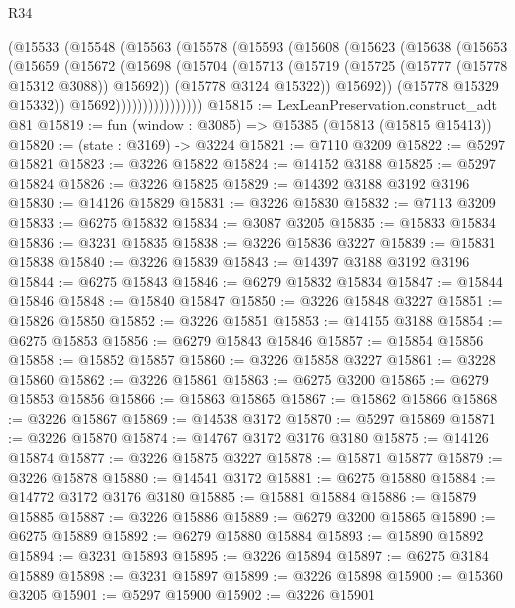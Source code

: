 \begin{lexlean}{R34}
\begin{coremodule}
                (@15533
                  (@15548
                    (@15563
                      (@15578
                        (@15593
                          (@15608
                            (@15623
                              (@15638
                                (@15653
                                  (@15659
                                    (@15672
                                      (@15698
                                        (@15704
                                          (@15713
                                            (@15719 (@15725 (@15777 (@15778 @15312 @3088)) @15692))
                                            (@15778 @3124 @15322))
                                          @15692))
                                      (@15778 @15329 @15332))
                                    @15692))))))))))))))))
@15815 := LexLeanPreservation.construct_adt @81
@15819 := fun (window : @3085) => @15385 (@15813 (@15815 @15413))
@15820 := (state : @3169) -> @3224
@15821 := @7110 @3209
@15822 := @5297 @15821
@15823 := @3226 @15822
@15824 := @14152 @3188
@15825 := @5297 @15824
@15826 := @3226 @15825
@15829 := @14392 @3188 @3192 @3196
@15830 := @14126 @15829
@15831 := @3226 @15830
@15832 := @7113 @3209
@15833 := @6275 @15832
@15834 := @3087 @3205
@15835 := @15833 @15834
@15836 := @3231 @15835
@15838 := @3226 @15836 @3227
@15839 := @15831 @15838
@15840 := @3226 @15839
@15843 := @14397 @3188 @3192 @3196
@15844 := @6275 @15843
@15846 := @6279 @15832 @15834
@15847 := @15844 @15846
@15848 := @15840 @15847
@15850 := @3226 @15848 @3227
@15851 := @15826 @15850
@15852 := @3226 @15851
@15853 := @14155 @3188
@15854 := @6275 @15853
@15856 := @6279 @15843 @15846
@15857 := @15854 @15856
@15858 := @15852 @15857
@15860 := @3226 @15858 @3227
@15861 := @3228 @15860
@15862 := @3226 @15861
@15863 := @6275 @3200
@15865 := @6279 @15853 @15856
@15866 := @15863 @15865
@15867 := @15862 @15866
@15868 := @3226 @15867
@15869 := @14538 @3172
@15870 := @5297 @15869
@15871 := @3226 @15870
@15874 := @14767 @3172 @3176 @3180
@15875 := @14126 @15874
@15877 := @3226 @15875 @3227
@15878 := @15871 @15877
@15879 := @3226 @15878
@15880 := @14541 @3172
@15881 := @6275 @15880
@15884 := @14772 @3172 @3176 @3180
@15885 := @15881 @15884
@15886 := @15879 @15885
@15887 := @3226 @15886
@15889 := @6279 @3200 @15865
@15890 := @6275 @15889
@15892 := @6279 @15880 @15884
@15893 := @15890 @15892
@15894 := @3231 @15893
@15895 := @3226 @15894
@15897 := @6275 @3184 @15889
@15898 := @3231 @15897
@15899 := @3226 @15898
@15900 := @15360 @3205
@15901 := @5297 @15900
@15902 := @3226 @15901

\end{coremodule}
\end{lexlean}
